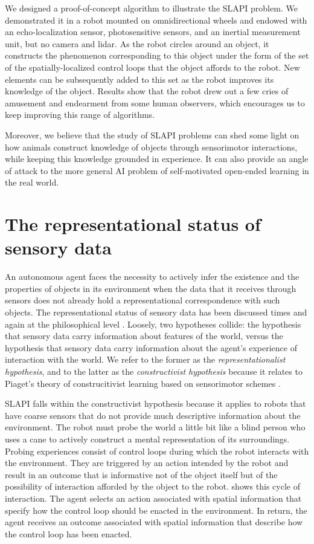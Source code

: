 \documentclass[pmlr]{jmlr}%
\begin{document}
We designed a proof-of-concept algorithm to illustrate the SLAPI problem. 
We demonstrated it in a robot mounted on omnidirectional wheels and endowed with an echo-localization sensor, photosensitive sensors, and an inertial measurement unit, but no camera and lidar. 
As the robot circles around an object, it constructs the phenomenon corresponding to this object under the form of the set of the spatially-localized control loops that the object affords to the robot. 
New elements can be subsequently added to this set as the robot improves its knowledge of the object. 
Results show that the robot drew out a few cries of amusement and endearment from some human observers, which encourages us to keep improving this range of algorithms. 

Moreover, we believe that the study of SLAPI problems can shed some light on how animals construct knowledge of objects through sensorimotor interactions, while keeping this knowledge grounded in experience. 
It can also provide an angle of attack to the more general AI problem of self-motivated open-ended learning in the real world.

\section{The representational status of sensory data}
\label{sec:input}

An autonomous agent faces the necessity to actively infer the existence and the properties of objects in its environment when the data that it receives through sensors does not already hold a representational correspondence with such objects. 
The representational status of sensory data has been discussed times and again at the philosophical level \citep[e.g.,][]{williford_husserls_2013}.
Loosely, two hypotheses collide: the hypothesis that sensory data carry information about features of the world, versus the hypothesis that sensory data carry information about the agent's experience of interaction with the world. 
We refer to the former as the \textit{representationalist hypothesis}, and to the latter as the \textit{constructivist hypothesis} because it relates to Piaget's theory of construcitivist learning based on sensorimotor schemes \citep{guillermin_artificial_2022}. 

SLAPI falls within the constructivist hypothesis because it applies to robots that have coarse sensors that do not provide much descriptive information about the environment. 
The robot must probe the world a little bit like a blind person who uses a cane to actively construct a mental representation of its surroundings. 
Probing experiences consist of control loops during which the robot interacts with the environment.   
They are triggered by an action intended by the robot and result in an outcome that is informative not of the object itself but of the possibility of interaction afforded by the object to the robot. 
 shows this cycle of interaction. 
The agent selects an action associated with spatial information that specify how the control loop should be enacted in the environment. 
In return, the agent receives an outcome associated with spatial information that describe how the control loop has been enacted. 
\end{document}
